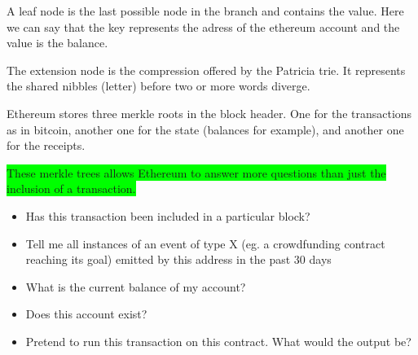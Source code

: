 A leaf node is the last possible node in the branch and contains the value. Here we can say that the key represents the adress of the ethereum account and the value is the balance. 

The extension node is the compression offered by the Patricia trie. It represents the shared nibbles (letter) before two or more words diverge. 



Ethereum\cite{Buterin..13} stores three merkle roots in the block header. One for the transactions as in bitcoin, another one for the state (balances for example), and another one for the receipts. 

\colorbox{lime}{
These merkle trees allows Ethereum to answer more questions than just the inclusion of a transaction.
}
\begin{itemize}
\item Has this transaction been included in a particular block?
\item Tell me all instances of an event of type X (eg. a crowdfunding contract reaching its goal) emitted by this address in the past 30 days
\item What is the current balance of my account?
\item Does this account exist?
\item Pretend to run this transaction on this contract. What would the output be?
\end{itemize}

